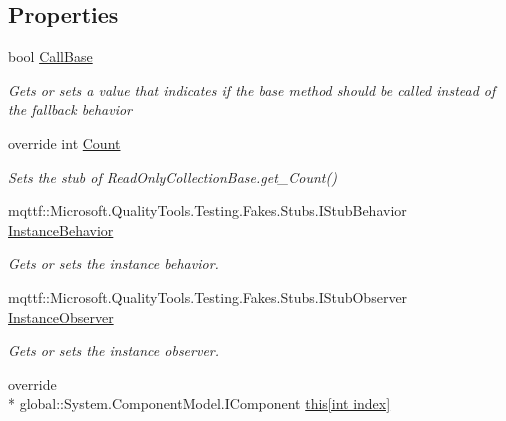\subsection*{Properties}
\begin{DoxyCompactItemize}
\item 
bool \hyperlink{class_system_1_1_component_model_1_1_fakes_1_1_stub_component_collection_a9a907a78a1a84b2bf7d60957e243e7f0}{Call\-Base}
\begin{DoxyCompactList}\small\item\em Gets or sets a value that indicates if the base method should be called instead of the fallback behavior\end{DoxyCompactList}\item 
override int \hyperlink{class_system_1_1_component_model_1_1_fakes_1_1_stub_component_collection_a15c1fb6c45b2d1536c20deedc7e30f83}{Count}
\begin{DoxyCompactList}\small\item\em Sets the stub of Read\-Only\-Collection\-Base.\-get\-\_\-\-Count()\end{DoxyCompactList}\item 
mqttf\-::\-Microsoft.\-Quality\-Tools.\-Testing.\-Fakes.\-Stubs.\-I\-Stub\-Behavior \hyperlink{class_system_1_1_component_model_1_1_fakes_1_1_stub_component_collection_a34fddb858a75dce2ff3b3b0806cb8429}{Instance\-Behavior}
\begin{DoxyCompactList}\small\item\em Gets or sets the instance behavior.\end{DoxyCompactList}\item 
mqttf\-::\-Microsoft.\-Quality\-Tools.\-Testing.\-Fakes.\-Stubs.\-I\-Stub\-Observer \hyperlink{class_system_1_1_component_model_1_1_fakes_1_1_stub_component_collection_a6a77419b8d6f982a71ec8484cbc42792}{Instance\-Observer}
\begin{DoxyCompactList}\small\item\em Gets or sets the instance observer.\end{DoxyCompactList}\item 
override \\*
global\-::\-System.\-Component\-Model.\-I\-Component \hyperlink{class_system_1_1_component_model_1_1_fakes_1_1_stub_component_collection_a6afffe2226272c520036f21ff239c55f}{this\mbox{[}int index\mbox{]}}

\end{DoxyCompactItemize}
